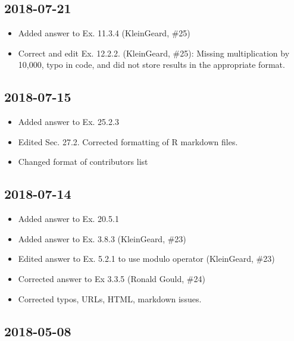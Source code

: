 \documentclass[]{book}
\providecommand{\tightlist}{%
  \setlength{\itemsep}{0pt}\setlength{\parskip}{0pt}}
\theoremstyle{plain}
\theoremstyle{remark}
\theoremstyle{definition}
\theoremstyle{definition}
\theoremstyle{definition}
\theoremstyle{remark}
\begin{document}
\hypertarget{section-12}{%
\subsection*{2018-07-21}\label{section-12}}

\begin{itemize}
\tightlist
\item
  Added answer to Ex. 11.3.4 (KleinGeard, \#25)
\item
  Correct and edit Ex. 12.2.2. (KleinGeard, \#25): Missing
  multiplication by 10,000, typo in code, and did not store results in
  the appropriate format.
\end{itemize}

\hypertarget{section-13}{%
\subsection*{2018-07-15}\label{section-13}}

\begin{itemize}
\tightlist
\item
  Added answer to Ex. 25.2.3
\item
  Edited Sec. 27.2. Corrected formatting of R markdown files.
\item
  Changed format of contributors list
\end{itemize}

\hypertarget{section-14}{%
\subsection*{2018-07-14}\label{section-14}}

\begin{itemize}
\tightlist
\item
  Added answer to Ex. 20.5.1
\item
  Added answer to Ex. 3.8.3 (KleinGeard, \#23)
\item
  Edited answer to Ex. 5.2.1 to use modulo operator (KleinGeard, \#23)
\item
  Corrected answer to Ex 3.3.5 (Ronald Gould, \#24)
\item
  Corrected typos, URLs, HTML, markdown issues.
\end{itemize}

\hypertarget{section-15}{%
\subsection*{2018-05-08}\label{section-15}}
\end{document}

